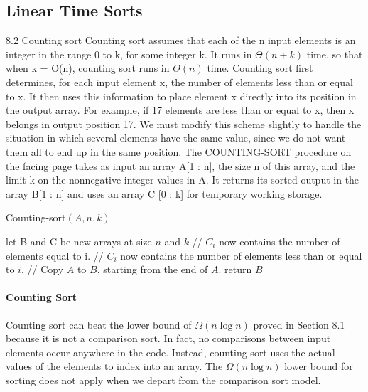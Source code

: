 \subsection{Linear Time Sorts}
8.2 Counting sort
Counting sort assumes that each of the n input elements is an integer in the range 0 to k, for some integer k. It runs in $\Theta \left(n + k\right)$ time, so that when k = O(n), counting sort runs in $\Theta\left(n\right)$ time.
Counting sort first determines, for each input element x, the number of elements less than or equal to x. It then uses this information to place element x directly into its position in the output array. For example, if 17 elements are less than or equal to x, then x belongs in output position 17. We must modify this scheme slightly to handle the situation in which several elements have the same value, since we do not want them all to end up in the same position.
The COUNTING-SORT procedure on the facing page takes as input an array A[1 : n], the size n of this array, and the limit k on the nonnegative integer values in A. It returns its sorted output in the array B[1 : n] and uses an array C [0 : k] for temporary working storage.


\begin{algbox}{Counting-sort$(A, n, k)$}
  \begin{algorithm}[H]
  	let B and C be new arrays at size $n$ and $k$
	// $C_{i}$ now contains the number of elements equal to i.
	// $C_{i}$ now contains the number of elements less than or equal to $i$.
	// Copy $A$ to $B$, starting from the end of $A$.
	  return $B$
  \end{algorithm}
\end{algbox}

\paragraph{Counting Sort}
Counting sort can beat the lower bound of $\Omega\left(n \log n\right)$ proved in Section 8.1 because it is not a comparison sort. In fact, no comparisons between input elements occur anywhere in the code. Instead, counting sort uses the actual values of the elements to index into an array. The $\Omega\left(n \log n\right)$ lower bound for sorting does not apply when we depart from the comparison sort model.


